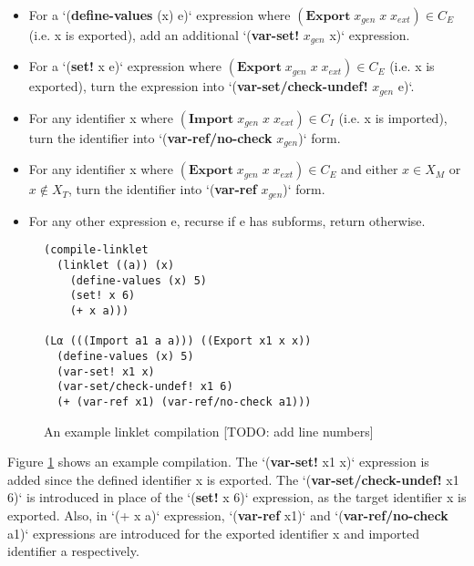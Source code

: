 \documentclass[sigplan,screen,anonymous]{acmart}
\begin{document}
\begin{itemize}
 \item For a `(\textbf{define-values} (x) e)` expression where \newline
   $(\textbf{Export}\; x_{gen}\; x\; x_{ext}) \in \mathit{C_E}$ (i.e. x
   is exported), add an additional `(\textbf{var-set!} $x_{gen}$ x)`
   expression.
 \item For a `(\textbf{set!} x e)` expression where \newline
   $(\textbf{Export}\; x_{gen}\; x\; x_{ext}) \in \mathit{C_E}$ (i.e. x
   is exported), turn the expression into
   `(\textbf{var-set/check-undef!} $x_{gen}$ e)`.
 \item For any identifier x where $(\textbf{Import}\; x_{gen}\; x\;
   x_{ext}) \in \mathit{C_I}$ (i.e. x is imported), turn the identifier
   into \newline `(\textbf{var-ref/no-check} $x_{gen}$)` form.
  \item For any identifier x where $(\textbf{Export}\; x_{gen}\; x\; x_{ext}) \in
    \mathit{C_E}$ and either $x \in \mathit{X_M}$ or $x \notin \mathit{X_T}$,
    turn the identifier into `(\textbf{var-ref} $x_{gen}$)` form.
  \item For any other expression e, recurse if e has subforms, return
    otherwise.
\end{itemize}

\begin{figure}[h]
\begin{verbatim}
(compile-linklet
  (linklet ((a)) (x)
    (define-values (x) 5)
    (set! x 6)
    (+ x a)))

(Lα (((Import a1 a a))) ((Export x1 x x))
  (define-values (x) 5)
  (var-set! x1 x)
  (var-set/check-undef! x1 6)
  (+ (var-ref x1) (var-ref/no-check a1)))
\end{verbatim}
\caption{An example linklet compilation [TODO: add line numbers]}
\label{fig:compile-example}
\end{figure}

Figure \ref{fig:compile-example} shows an example compilation. The
`(\textbf{var-set!} x1 x)` expression is added since the defined
identifier x is exported. The `(\textbf{var-set/check-undef!} x1 6)`
is introduced in place of the `(\textbf{set!} x 6)` expression, as the
target identifier x is exported. Also, in `(+ x a)` expression,
`(\textbf{var-ref} x1)` and `(\textbf{var-ref/no-check} a1)`
expressions are introduced for the exported identifier x and imported
identifier a respectively.
\end{document}
